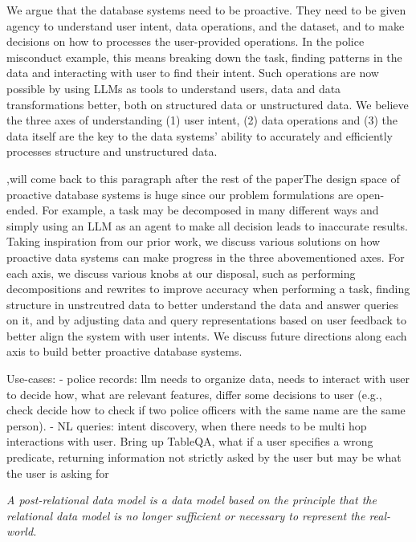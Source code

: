 We argue that the database systems need to be proactive. They need to be given agency to understand user intent, data operations, and the dataset, and to make decisions on how to processes the user-provided operations. In the police misconduct example, this means breaking down the task, finding patterns in the data and interacting with user to find their intent. Such operations are now possible by using LLMs as tools to understand users, data and data transformations better, both on structured data or unstructured data. We believe the three axes of understanding (1) user intent, (2) data operations and (3) the data 
itself are the key to the data systems' ability to accurately and efficiently processes structure and unstructured data. 

\sep{will come back to this paragraph after the rest of the paper}The design space of proactive database systems is huge since our problem formulations are open-ended. For example, a task may be decomposed in many different ways and simply using an LLM as an agent to make all decision leads to inaccurate results. Taking inspiration from our prior work, we discuss various solutions on how proactive data systems can make progress in the three abovementioned axes. For each axis, we discuss various knobs at our disposal, such as performing decompositions and rewrites to improve accuracy when performing a task, finding structure in unstrcutred data to better understand the data and answer queries on it, and by adjusting data and query representations based on user feedback to better align the system with user intents.  We discuss future directions along each axis to build better proactive database systems. 







\newpage

Use-cases:
- police records: llm needs to organize data, needs to interact with user to decide how, what are relevant features, differ some decisions to user (e.g., check decide how to check if two police officers with the same name are the same person). 
- NL queries: intent discovery, when there needs to be multi hop interactions with user. Bring up TableQA, what if a user specifies a wrong predicate, returning information not strictly asked by the user but may be what the user is asking for


\textit{A post-relational data model is a data model based on the principle that the relational data model is no longer sufficient or necessary to represent the real-world.}

